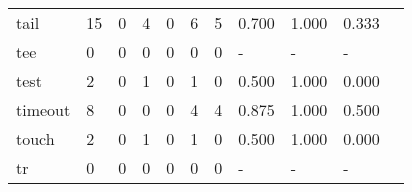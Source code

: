 \begin{longtable}{lp{1.2cm}p{1.2cm}p{1.2cm}p{1.2cm}p{1.2cm}p{1.2cm}p{1.2cm}p{1.2cm}p{1.2cm}p{1.2cm}}
tail      &                                    15 &                                                  0 &                                                4 &                                               0 &                                                6 &                                              5 &                                              0.700 &                                              1.000 &                                              0.333 \\
tee       &                                     0 &                                                  0 &                                                0 &                                               0 &                                                0 &                                              0 &                                                  - &                                                  - &                                                  - \\
test      &                                     2 &                                                  0 &                                                1 &                                               0 &                                                1 &                                              0 &                                              0.500 &                                              1.000 &                                              0.000 \\
timeout   &                                     8 &                                                  0 &                                                0 &                                               0 &                                                4 &                                              4 &                                              0.875 &                                              1.000 &                                              0.500 \\
touch     &                                     2 &                                                  0 &                                                1 &                                               0 &                                                1 &                                              0 &                                              0.500 &                                              1.000 &                                              0.000 \\
tr        &                                     0 &                                                  0 &                                                0 &                                               0 &                                                0 &                                              0 &                                                  - &                                                  - &                                                  - \\

\end{longtable}
